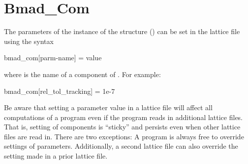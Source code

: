 \section{Bmad_Com}
\label{s:bmad.com}

The parameters of the  instance of the
 structure () can be set in
the lattice file using the syntax
\begin{example}
  bmad_com[parm-name] = value
\end{example}
where  is the name of a component of
. For example:
\begin{example}
  bmad_com[rel_tol_tracking] = 1e-7
\end{example}

Be aware that setting a  parameter value in a lattice
file will affect all computations of a program even if the program
reads in additional lattice files. That is, setting of 
components is ``sticky'' and persists even when other lattice files
are read in. There are two exceptions: A program is always free to
override settings of  parameters. Additionally, a second
lattice file can also override the setting made in a prior lattice
file.
